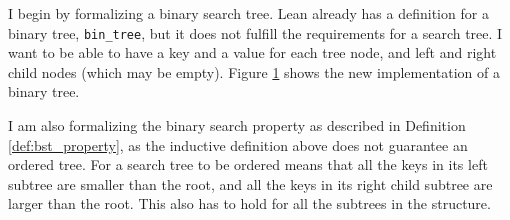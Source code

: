 I begin by formalizing a binary search tree. Lean already has a definition
for a binary tree, \lstinline{bin_tree}, but it does not fulfill the requirements for a search tree. 
I want to be able to have a key and a value for each tree node, and left and right child nodes (which may be empty).
Figure \ref{fig:btree_def} shows the new implementation of a binary tree.

\begin{figure}[!h]
  \caption{}
  \label{fig:btree_def}
\end{figure}


I am also formalizing the binary search property as described in Definition \ref{def:bst_property}, as the inductive definition above does not 
guarantee an ordered tree.
For a search tree to be ordered means that all the keys in its left subtree are smaller than the root, and all the keys in its right child subtree 
are larger than the root. This also has to hold for all the subtrees in the structure.

\begin{figure}[!h]
  \caption{}
  \label{fig:forall_keys}
\end{figure}


\begin{figure}[!h]
  \caption{}
  \label{fig:ordered}
\end{figure}
